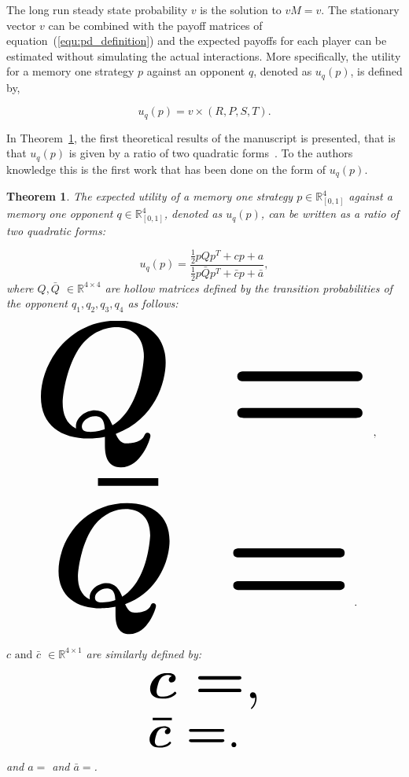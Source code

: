 \documentclass[10pt]{article}
\newcommand{\R}{\mathbb{R}}
\newtheorem{theorem}{Theorem}
\begin{document}
The long run steady state probability \(v\) is the solution to \(v M = v\). The
stationary vector \(v\) can be combined with the payoff matrices of
equation~(\ref{equ:pd_definition}) and the expected payoffs for each player
can be estimated without simulating the actual interactions. More
specifically, the utility for a memory one strategy \(p\) against an opponent \(q\),
denoted as \(u_q(p)\), is defined by,

\begin{equation}\label{eq:press_dyson_utility}
    u_q(p) = v \times (R, P, S, T).
\end{equation}

In Theorem~\ref{theorem:quadratic_form_u}, the first theoretical results of
the manuscript is presented, that is that \(u_q(p)\) is given by a ratio of
two quadratic forms~\cite{kepner2011}. To the authors knowledge this is the
first work that has been done on the form of \(u_q(p)\).

\begin{theorem}\label{theorem:quadratic_form_u}
    The expected utility of a memory one strategy \(p\in\mathbb{R}_{[0,1]}^4\)
    against a memory one opponent \(q\in\mathbb{R}_{[0,1]}^4\), denoted
    as \(u_q(p)\), can be written as a ratio of two quadratic forms:

    \begin{equation}\label{eq:optimisation_quadratic}
    u_q(p) = \frac{\frac{1}{2}pQp^T + cp + a}
                {\frac{1}{2}p\bar{Q}p^T + \bar{c}p + \bar{a}},
    \end{equation}
    where \(Q, \bar{Q}\) \(\in \R^{4\times4}\) are hollow matrices defined by the
    transition probabilities of the opponent \(q_1, q_2, q_3, q_4\) as follows:

    \begin{center}
    \begin{equation}
    \resizebox{0.9\linewidth}{!}{\arraycolsep=2.5pt%
    \boldmath\(
    Q = \)},
    \end{equation}
    \begin{equation}\label{eq:q_bar_matrix}
    \resizebox{0.8\linewidth}{!}{\arraycolsep=2.5pt%
    \boldmath\(
    \bar{Q} =  \)}.
    \end{equation}
    \end{center}

    \(c \text{ and } \bar{c}\) \(\in \R^{4 \times 1}\) are similarly defined by:

    \begin{equation}\label{eq:q_matrix_numerator}
    \resizebox{0.3\linewidth}{!}{\arraycolsep=2.5pt%
    \boldmath\(c = \),}
    \end{equation}
    \begin{equation}\label{eq:q_matrix_denominator}
    \resizebox{0.3\linewidth}{!}{\arraycolsep=2.5pt%
    \boldmath\(\bar{c} = \).
    }
    \end{equation}
    and \(a = \) and
    \(\bar{a} = \).
\end{theorem}
\end{document}
